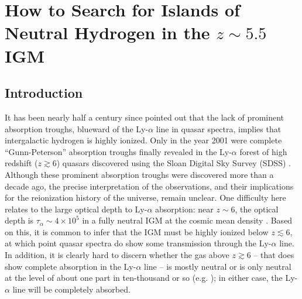 

\ifpdf
    \graphicspath{{neutral_islands/figures/PNG/}{example_chapter/figures/PDF/}{neutral_islands/figures/}}
\else
    \graphicspath{{neutral_islands/figures/EPS/}{neutral_islands/figures/}}
\fi


\chapter{How to Search for Islands of Neutral Hydrogen in the $z \sim 5.5$ IGM}
\section{Introduction} \label{sec:intro}


It has been nearly half a century since \citet{1965ApJ...142.1633G} pointed out that the lack of prominent
absorption troughs, blueward of the Ly-$\alpha$ line in quasar spectra, implies that intergalactic
hydrogen is highly ionized. 
Only in the year 2001 were 
complete ``Gunn-Peterson'' absorption troughs finally revealed in 
the Ly-$\alpha$ forest of high redshift ($z \gtrsim 6$) quasars discovered using the Sloan Digital Sky Survey (SDSS)
\citep{Fan:2001ff,Becker:2001ee,Djorgovski:2001ez}. 
Although these prominent absorption troughs were discovered more than a decade ago, the precise interpretation
of the observations, and their implications for the reionization history of the universe,
remain unclear. One difficulty here relates to the large optical depth to
Ly-$\alpha$ absorption: near $z \sim 6$, the optical depth 
is $\tau_\alpha \sim 4 \times 10^5$ in a fully neutral IGM at the cosmic mean density \citep{1965ApJ...142.1633G}. Based on this, it is common to infer 
that the IGM must be highly ionized below $z \lesssim 6$,
at which point quasar spectra do show some transmission through the Ly-$\alpha$ line. In addition, it is clearly hard
to discern whether the gas above $z \gtrsim 6$ -- that does show complete absorption in the Ly-$\alpha$ line --
is mostly neutral or is only neutral at the level of about one part in ten-thousand or so (e.g. \citealt{Fan:2005es}); in either case,
the Ly-$\alpha$ line will be completely absorbed.

